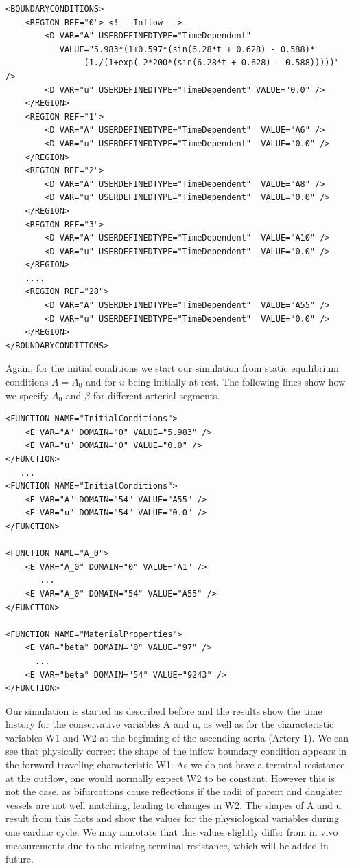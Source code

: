 \begin{lstlisting}[style=XmlStyle]
<BOUNDARYCONDITIONS>
    <REGION REF="0"> <!-- Inflow -->
        <D VAR="A" USERDEFINEDTYPE="TimeDependent"
           VALUE="5.983*(1+0.597*(sin(6.28*t + 0.628) - 0.588)*
                (1./(1+exp(-2*200*(sin(6.28*t + 0.628) - 0.588)))))" />
        <D VAR="u" USERDEFINEDTYPE="TimeDependent" VALUE="0.0" />
    </REGION>
    <REGION REF="1">
        <D VAR="A" USERDEFINEDTYPE="TimeDependent"  VALUE="A6" />
        <D VAR="u" USERDEFINEDTYPE="TimeDependent"  VALUE="0.0" />
    </REGION>
    <REGION REF="2">
        <D VAR="A" USERDEFINEDTYPE="TimeDependent"  VALUE="A8" />
        <D VAR="u" USERDEFINEDTYPE="TimeDependent"  VALUE="0.0" />
    </REGION>
    <REGION REF="3">
        <D VAR="A" USERDEFINEDTYPE="TimeDependent"  VALUE="A10" />
        <D VAR="u" USERDEFINEDTYPE="TimeDependent"  VALUE="0.0" />
    </REGION>
    ....
    <REGION REF="28">
        <D VAR="A" USERDEFINEDTYPE="TimeDependent"  VALUE="A55" />
        <D VAR="u" USERDEFINEDTYPE="TimeDependent"  VALUE="0.0" />
    </REGION>
</BOUNDARYCONDITIONS>
\end{lstlisting}

Again, for the initial conditions we start our simulation from static
equilibrium conditions $A = A_0$ and for $u$ being initially at rest. The
following lines show how we specify $A_0$ and $\beta$ for different arterial
segments.
\begin{lstlisting}[style=XmlStyle]
<FUNCTION NAME="InitialConditions">
    <E VAR="A" DOMAIN="0" VALUE="5.983" />
    <E VAR="u" DOMAIN="0" VALUE="0.0" />
</FUNCTION>
   ...
<FUNCTION NAME="InitialConditions">
    <E VAR="A" DOMAIN="54" VALUE="A55" />
    <E VAR="u" DOMAIN="54" VALUE="0.0" />
</FUNCTION>

<FUNCTION NAME="A_0">
    <E VAR="A_0" DOMAIN="0" VALUE="A1" />
       ...
    <E VAR="A_0" DOMAIN="54" VALUE="A55" />
</FUNCTION>

<FUNCTION NAME="MaterialProperties">
    <E VAR="beta" DOMAIN="0" VALUE="97" />
      ...
    <E VAR="beta" DOMAIN="54" VALUE="9243" />
</FUNCTION>
\end{lstlisting}

Our simulation is started as described before and the results show the time
history for the conservative variables A and u, as well as for the
characteristic variables W1 and W2 at the beginning of the ascending aorta
(Artery 1). We can see that physically correct the shape of the inflow boundary
condition appears in the forward traveling characteristic W1. As we do not have
a terminal resistance at the outflow, one would normally expect W2 to be
constant. However this is not the case, as bifurcations cause reflections if the
radii of parent and daughter vessels are not well matching, leading to changes
in W2. The shapes of A and u result from this facts and show the values for the
physiological variables during one cardiac cycle. We may annotate that this
values slightly differ from in vivo measurements due to the missing terminal
resistance, which will be added in future.

